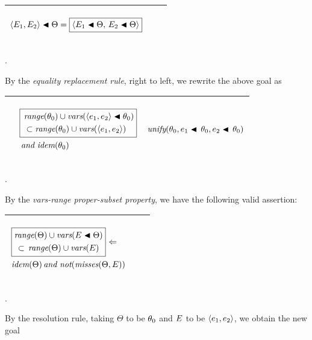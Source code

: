 \documentclass[runningheads]{llncs}
\DeclareMathOperator{\uand}{\emph{and}\,}
\DeclareMathOperator{\unot}{\emph{not}\kern-.0pt}
\DeclareMathOperator{\uimpliedby}{\Leftarrow}
\DeclareMathOperator{\unify}{\emph{unify}}
\DeclareMathOperator{\idem}{\emph{idem}}
\begin{document}
  \begin{center}
  \begin{tabular}{|m{}|m{}||m{}|}
\hline
\begin{center}
\vspace{15pt}
{$\begin{aligned}
        \langle E_{1}, E_{2} \rangle \blacktriangleleft \Theta =
        \boxed{\langle E_{1}\blacktriangleleft\Theta, \, E_{2}\blacktriangleleft\Theta \rangle}
    \end{aligned}$}
\end{center}  \hspace{1cm} 
&  & \\  \hline
\end{tabular}.
\end{center} 
By the \emph{equality replacement rule}, right to left, we rewrite the above goal as
\begin{center}
\begin{tabular}{|m{}|m{}||m{}|}
 \hline
  & 
 \begin{center}
{$\begin{aligned}
 &\boxed{\begin{aligned}
  &\,\range(\thet{0}) \cup \vars(\langle \e{1}, \e{2}\rangle \apply\thet{0} ) \\ 
  &\,  \subset \range(\thet{0}) \cup \vars( \langle \e{1}, \e{2}\rangle ) 
\end{aligned}}  \\
& \uand \idem(\thet{0}) 
 \end{aligned} $}
\end{center}
& 
\begin{center}$\unify(\thet{0}, \e{1}\apply\,\thet{0}, \e{2}\apply\,\thet{0})$ \end{center}\\
\hline
\end{tabular}.
\end{center}

By the \emph{vars-range proper-subset property}, we have the following valid assertion:
 \begin{center}
  \begin{tabular}{|m{}|m{}||m{}|}
\hline
\begin{center}
$ \begin{aligned}
    &\,
    \boxed{\begin{aligned}
    &\range(\Theta) \cup \vars(\var{E} \apply \Theta) \\
    &\,\subset\, \range(\Theta) \cup \vars(\var{E}) \\    
    \end{aligned}} \,\uimpliedby \\
     &\idem(\Theta) \uand \unot(\misses(\Theta, \var{E}))
\end{aligned}$
\end{center} \hspace{1cm} 
&  & \\  \hline
\end{tabular}.
\end{center} 
By the resolution rule, taking $\Theta$ to be $\theta_{0}$ and $E$ to be $\langle e_{1}, e_{2}\rangle$, we obtain the new goal
\end{document}
